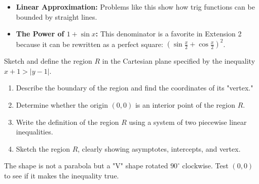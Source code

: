\begin{takeaways}
\begin{itemize}[leftmargin=*]
\item \textbf{Linear Approximation:} Problems like this show how trig functions can be bounded by straight lines.
\item \textbf{The Power of $1+\sin x$:} This denominator is a favorite in Extension 2 because it can be rewritten as a perfect square: $(\sin \frac{x}{2} + \cos \frac{x}{2})^2$.
\end{itemize}
\end{takeaways}

\begin{problem}
Sketch and define the region $R$ in the Cartesian plane specified by the inequality $x + 1 > |y - 1|$.
\begin{enumerate}[label=(\roman*)]
\item Describe the boundary of the region and find the coordinates of its "vertex."
\item Determine whether the origin $(0, 0)$ is an interior point of the region $R$.
\item Write the definition of the region $R$ using a system of two piecewise linear inequalities.
\item Sketch the region $R$, clearly showing asymptotes, intercepts, and vertex.
\end{enumerate}

\begin{center}
\end{center}
\end{problem}

\begin{hint}
The shape is not a parabola but a "V" shape rotated $90^\circ$ clockwise. Test $(0,0)$ to see if it makes the inequality true.
\end{hint}

